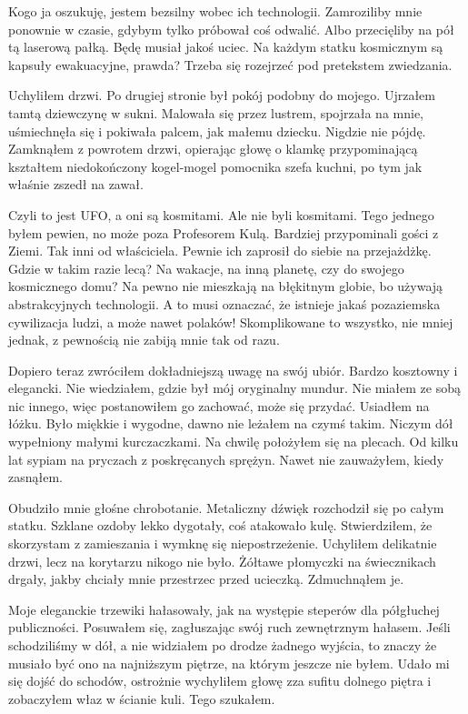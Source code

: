 Kogo ja oszukuję, jestem bezsilny wobec ich technologii.
Zamroziliby mnie ponownie w czasie, gdybym tylko próbował coś odwalić.
Albo przecięliby na pół tą laserową pałką.
Będę musiał jakoś uciec. Na każdym statku kosmicznym są kapsuły ewakuacyjne, prawda?
Trzeba się rozejrzeć pod pretekstem zwiedzania.

Uchyliłem drzwi. Po drugiej stronie był pokój podobny do mojego.
Ujrzałem tamtą dziewczynę w sukni.
Malowała się przez lustrem, spojrzała na mnie, uśmiechnęła się i pokiwała palcem, jak małemu dziecku.
Nigdzie nie pójdę. Zamknąłem z powrotem drzwi, opierając głowę o klamkę przypominającą kształtem niedokończony kogel-mogel pomocnika szefa kuchni, po tym jak właśnie zszedł na zawał.

Czyli to jest UFO, a oni są kosmitami.
Ale nie byli kosmitami. Tego jednego byłem pewien, no może poza Profesorem Kulą.
Bardziej przypominali gości z Ziemi. Tak inni od właściciela. Pewnie ich zaprosił do siebie na przejażdżkę.
Gdzie w takim razie lecą?
Na wakacje, na inną planetę, czy do swojego kosmicznego domu?
Na pewno nie mieszkają na błękitnym globie, bo używają abstrakcyjnych technologii.
A to musi oznaczać, że istnieje jakaś pozaziemska cywilizacja ludzi, a może nawet polaków!
Skomplikowane to wszystko, nie mniej jednak, z pewnością nie zabiją mnie tak od razu.

Dopiero teraz zwróciłem dokładniejszą uwagę na swój ubiór.
Bardzo kosztowny i elegancki. Nie wiedziałem, gdzie był mój oryginalny mundur. 
Nie miałem ze sobą nic innego, więc postanowiłem go zachować, może się przydać.
Usiadłem na łóżku. Było miękkie i wygodne, dawno nie leżałem na czymś takim. Niczym dół wypełniony małymi kurczaczkami. Na chwilę położyłem się na plecach.
Od kilku lat sypiam na pryczach z poskręcanych sprężyn.
Nawet nie zauważyłem, kiedy zasnąłem.

Obudziło mnie głośne chrobotanie. Metaliczny dźwięk rozchodził się po całym statku.
Szklane ozdoby lekko dygotały, coś atakowało kulę.
Stwierdziłem, że skorzystam z zamieszania i wymknę się niepostrzeżenie.
Uchyliłem delikatnie drzwi, lecz na korytarzu nikogo nie było. Żółtawe płomyczki na świecznikach drgały, jakby chciały mnie przestrzec przed ucieczką. Zdmuchnąłem je.

Moje eleganckie trzewiki hałasowały, jak na występie steperów dla półgłuchej publiczności.
Posuwałem się, zagłuszając swój ruch zewnętrznym hałasem.
Jeśli schodziliśmy w dół, a nie widziałem po drodze żadnego wyjścia, to znaczy że musiało być ono na najniższym piętrze, na którym jeszcze nie byłem.
Udało mi się dojść do schodów, ostrożnie wychyliłem głowę zza sufitu dolnego piętra i zobaczyłem właz w ścianie kuli.
Tego szukałem.

